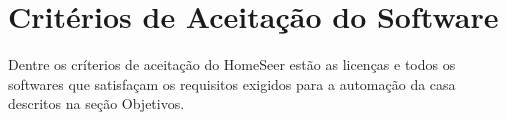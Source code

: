\section{Critérios de Aceitação do Software}
	Dentre os críterios de aceitação do HomeSeer estão as licenças e todos os softwares que satisfaçam os requisitos
	exigidos para a automação da casa descritos na seção Objetivos.
